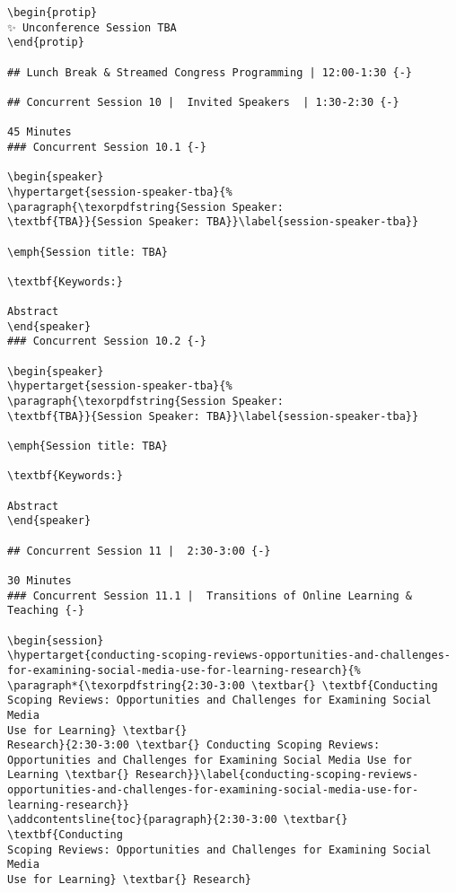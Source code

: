 \documentclass[
]{book}
\begin{document}
\begin{verbatim}
\begin{protip}
✨ Unconference Session TBA
\end{protip}

## Lunch Break & Streamed Congress Programming | 12:00-1:30 {-}

## Concurrent Session 10 |  Invited Speakers  | 1:30-2:30 {-}

45 Minutes
### Concurrent Session 10.1 {-}

\begin{speaker}
\hypertarget{session-speaker-tba}{%
\paragraph{\texorpdfstring{Session Speaker:
\textbf{TBA}}{Session Speaker: TBA}}\label{session-speaker-tba}}

\emph{Session title: TBA}

\textbf{Keywords:}

Abstract
\end{speaker}
### Concurrent Session 10.2 {-}

\begin{speaker}
\hypertarget{session-speaker-tba}{%
\paragraph{\texorpdfstring{Session Speaker:
\textbf{TBA}}{Session Speaker: TBA}}\label{session-speaker-tba}}

\emph{Session title: TBA}

\textbf{Keywords:}

Abstract
\end{speaker}

## Concurrent Session 11 |  2:30-3:00 {-}

30 Minutes
### Concurrent Session 11.1 |  Transitions of Online Learning & Teaching {-}

\begin{session}
\hypertarget{conducting-scoping-reviews-opportunities-and-challenges-for-examining-social-media-use-for-learning-research}{%
\paragraph*{\texorpdfstring{2:30-3:00 \textbar{} \textbf{Conducting
Scoping Reviews: Opportunities and Challenges for Examining Social Media
Use for Learning} \textbar{}
Research}{2:30-3:00 \textbar{} Conducting Scoping Reviews: Opportunities and Challenges for Examining Social Media Use for Learning \textbar{} Research}}\label{conducting-scoping-reviews-opportunities-and-challenges-for-examining-social-media-use-for-learning-research}}
\addcontentsline{toc}{paragraph}{2:30-3:00 \textbar{} \textbf{Conducting
Scoping Reviews: Opportunities and Challenges for Examining Social Media
Use for Learning} \textbar{} Research}


\end{verbatim}
\end{document}
